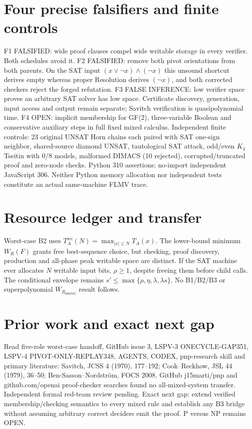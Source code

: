 \documentclass[11pt]{article}
\begin{document}
\section*{Four precise falsifiers and finite controls}
F1 FALSIFIED: wide proof clauses compel wide writable storage in every verifier. Both schedules avoid it. F2 FALSIFIED: remove both pivot orientations from both parents. On the SAT input $(x\vee\neg x)\wedge(\neg x)$ this unsound shortcut derives empty whereas proper Resolution derives $(\neg x)$, and both corrected checkers reject the forged refutation. F3 FALSE INFERENCE: low verifier space proves an arbitrary SAT solver has low space. Certificate discovery, generation, input access and output remain separate; Savitch verification is quasipolynomial time. F4 OPEN: implicit membership for GF(2), three-variable Boolean and conservative auxiliary steps in full fixed mixed calculus.
Independent finite controls: 23 original UNSAT Horn chains each paired with SAT one-sign neighbor, shared-source diamond UNSAT, tautological SAT attack, odd/even $K_4$ Tseitin with 0/8 models, malformed DIMACS (10 rejected), corrupted/truncated proof and zero-node checks. Python 310 assertions; no-import independent JavaScript 306. Neither Python memory allocation nor independent tests constitute an actual same-machine FLMV trace.
\section*{Resource ledger and transfer}
Worst-case B2 uses $T_A^{wc}(N)=\max_{|x|\le N}T_A(x)$. The lower-bound minimum $W_R(F)$ grants free best-sequence choice, but checking, proof discovery, production and all-phase peak writable space are distinct. If the SAT machine ever allocates $N$ writable input bits, $\rho\ge1$, despite freeing them before child calls. The conditional envelope remains $s'\le\max\{\rho,\eta,\lambda,\lambda s\}$. No B1/B2/B3 or superpolynomial $\overline W_{R_{\mathrm{mix341}}}$ result follows.
\section*{Prior work and exact next gap}
Read five-role worst-case handoff, GitHub issue 3, LSPV-3 ONECYCLE-GAP351, LSPV-4 PIVOT-ONLY-REPLAY348, AGENTS, CODEX, pnp-research skill and primary literature: Savitch, JCSS 4 (1970), 177--192; Cook--Reckhow, JSL 44 (1979), 36--50; Ben-Sasson--Nordstr\"om, FOCS 2008. GitHub j15marti/pnp and github.com/openai proof-checker searches found no all-mixed-system transfer. Independent formal red-team review pending. Exact next gap: extend verified membership/checking semantics to every mixed rule and establish any B3 bridge without assuming arbitrary correct deciders emit the proof. P versus NP remains OPEN.
\end{document}
